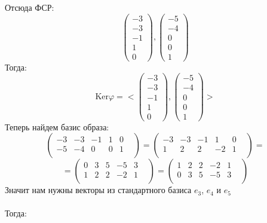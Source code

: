 \documentclass[a4paper,12pt]{article}
\begin{document}
Отсюда ФСР:
\[
\begin{pmatrix}
-3 \\ -3 \\ -1 \\ 1 \\ 0 
\end{pmatrix}
,
\begin{pmatrix}
-5 \\ -4 \\ 0 \\ 0 \\ 1
\end{pmatrix}
\]
Тогда:
\[
\text{Ker} \varphi = <\begin{pmatrix}
-3 \\ -3 \\ -1 \\ 1 \\ 0 
\end{pmatrix}
,
\begin{pmatrix}
-5 \\ -4 \\ 0 \\ 0 \\ 1
\end{pmatrix}>
\]
Теперь найдем базис образа:
\[
\begin{pmatrix}
-3 & -3 & -1 & 1 & 0 & \\
-5 & -4 & 0 & 0 & 1 & \\
\end{pmatrix}
=
\begin{pmatrix}
-3 & -3 & -1 & 1 & 0 & \\
1 & 2 & 2 & -2 & 1 & \\
\end{pmatrix}
=
\]
\[
=
\begin{pmatrix}
0 & 3 & 5 & -5 & 3 & \\
1 & 2 & 2 & -2 & 1 & \\
\end{pmatrix}
=
\begin{pmatrix}
1 & 2 & 2 & -2 & 1 & \\
0 & 3 & 5 & -5 & 3 & \\
\end{pmatrix}
\]
Значит нам нужны векторы из стандартного базиса $e_3$, $e_4$ и $e_5$
\\\\
Тогда:
\end{document}

